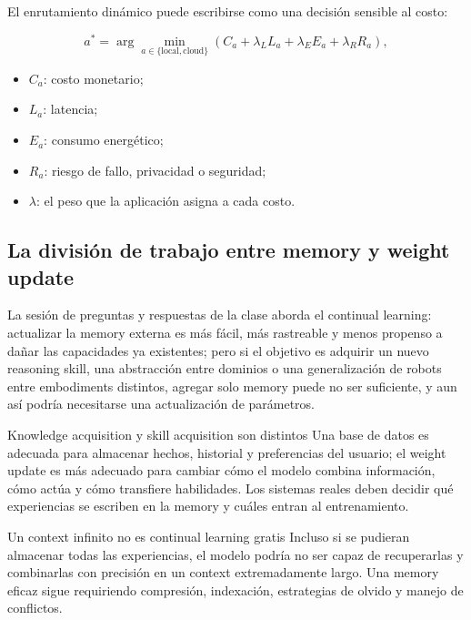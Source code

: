 \documentclass[a4paper]{article}
\begin{document}
El enrutamiento dinámico puede escribirse como una decisión sensible al costo:

$$
a^*=\arg\min_{a\in\{\text{local},\text{cloud}\}}
\left(C_a+\lambda_L L_a+\lambda_E E_a+\lambda_R R_a\right),
$$

\begin{itemize}
    \item $C_a$: costo monetario;
    \item $L_a$: latencia;
    \item $E_a$: consumo energético;
    \item $R_a$: riesgo de fallo, privacidad o seguridad;
    \item $\lambda$: el peso que la aplicación asigna a cada costo.
\end{itemize}

\subsection{La división de trabajo entre memory y weight update}

La sesión de preguntas y respuestas de la clase aborda el continual learning: actualizar la memory externa es más fácil, más rastreable y menos propenso a dañar las capacidades ya existentes; pero si el objetivo es adquirir un nuevo reasoning skill, una abstracción entre dominios o una generalización de robots entre embodiments distintos, agregar solo memory puede no ser suficiente, y aun así podría necesitarse una actualización de parámetros.

\begin{knowledgebox}{Knowledge acquisition y skill acquisition son distintos}
Una base de datos es adecuada para almacenar hechos, historial y preferencias del usuario; el weight update es más adecuado para cambiar cómo el modelo combina información, cómo actúa y cómo transfiere habilidades. Los sistemas reales deben decidir qué experiencias se escriben en la memory y cuáles entran al entrenamiento.
\end{knowledgebox}

\begin{warningbox}{Un context infinito no es continual learning gratis}
Incluso si se pudieran almacenar todas las experiencias, el modelo podría no ser capaz de recuperarlas y combinarlas con precisión en un context extremadamente largo. Una memory eficaz sigue requiriendo compresión, indexación, estrategias de olvido y manejo de conflictos.
\end{warningbox}
\end{document}
